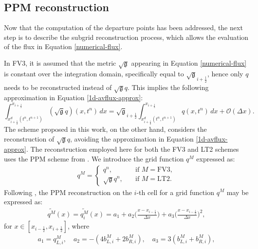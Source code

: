 \documentclass[preprint,12pt]{elsarticle}
\begin{document}
\begin{linenumbers}
\subsection{PPM reconstruction}
\label{ppm-recon}
Now that the computation of the departure points has been addressed, the next step is to describe the subgrid reconstruction process, which allows the evaluation of the flux in Equation \eqref{numerical-flux}.

In FV3, it is assumed that the metric $\sqrt{\mathfrak{g}}$ appearing in Equation \eqref{numerical-flux} is constant over the integration domain, specifically equal to $\sqrt{\mathfrak{g}}_{i+\frac{1}{2}}$, hence only $q$ needs to be reconstructed instead of $\sqrt{\mathfrak{g}}q$.
This implies the following approximation in Equation \eqref{1d-avflux-approx}:
\begin{equation}
	\label{1d-avflux-approx}
	\int^{x_{i+\frac{1}{2}}}_{ x_{i+\frac{1}{2}}^d(t^n,t^{n+1})} (\sqrt{\mathfrak{g}}q)(x,t^n)\,dx = 
	\sqrt{\mathfrak{g}}_{i+\frac{1}{2}}
	\int^{x_{i+\frac{1}{2}}}_{ x_{i+\frac{1}{2}}^d(t^n,t^{n+1})} q(x,t^n)\,dx + \mathcal{O}(\Delta x).
\end{equation}
The scheme proposed in this work, on the other hand, considers the reconstruction of $\sqrt{\mathfrak{g}}q$, avoiding the approximation in Equation \eqref{1d-avflux-approx}.
The reconstruction employed here for both the FV3 and LT2 schemes uses the PPM scheme from \cite{colella:1984,carpenter:1990}.
We introduce the grid function $q^M$ expressed as:
\begin{align}
	\label{ppm_q_m}
    q^M = 
	\begin{cases}
        q^n,
		\quad &\text{if }{M=\text{FV3}},\\
        \sqrt{\mathfrak{g}}q^n,
		\quad &\text{if }{M=\text{LT2}}.
	\end{cases}
\end{align}
Following \cite{harris:2021}, the PPM reconstruction on the $i$-th cell for a grid function $q^M$ may be expressed as:
\begin{align}
	\label{ppm-formula}
	\widetilde{q^M}(x) =
	\widetilde{q^M_i}(x) =
	a_1+ a_2
	\bigg(\frac{x-x_{i-\frac{1}{2}}}{\Delta x}\bigg)+
	a_3
	\bigg(\frac{x-x_{i-\frac{1}{2}}}{\Delta x}\bigg)^2,
\end{align}
for $x \in [x_{i-\frac{1}{2}},x_{i+\frac{1}{2}}]$, where
\begin{align}
	a_1 = q_{L,i}^M , \quad
	a_2 = -(4b_{L,i}^M +2b_{R,i}^M), \quad
	a_3 = 3(b_{L,i}^M +b_{R,i}^M ) , 
\end{align}

\end{linenumbers}
\end{document}
